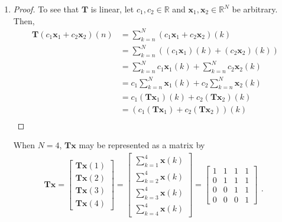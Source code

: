 \documentclass[12pt]{amsart}
\begin{document}


\begin{enumerate}[label=\arabic*.]
	\item
\begin{proof}
	To see that $\mathbf{T}$ is linear, 
	let \(c_1,c_2\in\mathbb{R}\) and 
	\(\mathbf{x}_1, \mathbf{x}_2 \in \mathbb{R}^N\) be arbitrary. Then,
	\begin{align*}
		\mathbf{T}(c_1\mathbf{x}_1 + c_2\mathbf{x}_2)(n)
		&= \sum_{k=n}^{N}(c_1\mathbf{x}_1 + c_2\mathbf{x}_2)(k) \\
		&= \sum_{k=n}^{N}((c_1\mathbf{x}_1)(k) + (c_2\mathbf{x}_2)(k)) \\
		&= \sum_{k=n}^{N}c_1\mathbf{x}_1(k) + \sum_{k=n}^{N}c_2\mathbf{x}_2(k) \\
		&= c_1\sum_{k=n}^{N}\mathbf{x}_1(k) + c_2\sum_{k=n}^{N}\mathbf{x}_2(k) \\
		&= c_1(\mathbf{T}\mathbf{x}_1)(k) + c_2(\mathbf{T}\mathbf{x}_2)(k) \\
		&= (c_1(\mathbf{T}\mathbf{x}_1) + c_2(\mathbf{T}\mathbf{x}_2))(k) \\
	\end{align*}
\end{proof}
When \(N=4\), $\mathbf{T}\mathbf{x}$ may be represented as a matrix by
\begin{align*}
	\mathbf{T}\mathbf{x}
	= \begin{bmatrix} \mathbf{T}\mathbf{x}(1) \\ \mathbf{T}\mathbf{x}(2) \\ \mathbf{T}\mathbf{x}(3) \\ \mathbf{T}\mathbf{x}(4) \end{bmatrix}
	= \begin{bmatrix} \sum_{k=1}^{4}\mathbf{x}(k) \\ \sum_{k=2}^{4}\mathbf{x}(k) \\ \sum_{k=3}^{4}\mathbf{x}(k) \\ \sum_{k=4}^{4}\mathbf{x}(k) \end{bmatrix}
	= \begin{bmatrix} 1&1&1&1 \\ 0&1&1&1 \\ 0&0&1&1 \\ 0&0&0&1 \end{bmatrix} 
	\begin{matrix} \\ \\ \\ . \end{matrix}
\end{align*}


\end{enumerate}
\end{document}
